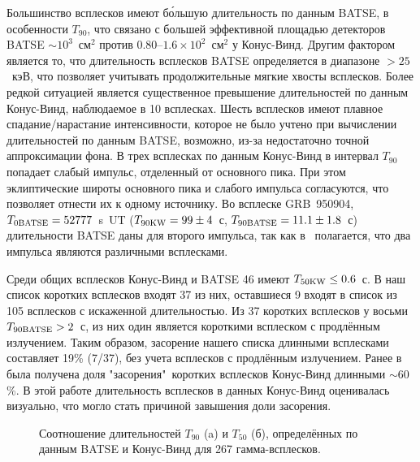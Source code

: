 Большинство всплесков имеют б\'{о}льшую длительность по данным BATSE, в особенности $T_{90}$, что связано с большей  эффективной площадью детекторов BATSE $\sim 10^3$~см$^2$ против 0.80--$1.6\times 10^2$~см$^2$ у Конус-Винд. Другим фактором является то, что длительность всплесков BATSE определяется в диапазоне $>25$~кэВ, что позволяет учитывать продолжительные мягкие хвосты всплесков. Более редкой ситуацией является существенное превышение длительностей по данным Конус-Винд, наблюдаемое в 10 всплесках. Шесть всплесков имеют плавное спадание/нарастание интенсивности, которое не было учтено при вычислении  длительностей по данным BATSE, возможно, из-за недостаточно точной аппроксимации фона. В трех всплесках по данным Конус-Винд в интервал $T_{90}$ попадает слабый импульс, отделенный от основного пика. При этом эклиптические широты основного пика и слабого импульса согласуются, что позволяет отнести их к одному источнику. Во всплеске GRB~950904, $T_{0\mbox{\scriptsize BATSE}} = 52777$~s~UT ($T_{90\mbox{\scriptsize KW}} = 99 \pm 4$~с, $T_{90\mbox{\scriptsize BATSE}} = 11.1\pm 1.8$~с) длительности BATSE даны для второго импульса, так как в~\citep{Hurley_2005} полагается, что два импульса являются различными всплесками.

Среди общих всплесков Конус-Винд и BATSE 46 имеют $T_{50\mbox{\scriptsize KW}} \leq 0.6$~с. В наш список коротких всплесков входят 37 из них, оставшиеся 9 входят в список из 105 всплесков с искаженной длительностью. Из 37 коротких всплесков у восьми $T_{90\mbox{\scriptsize BATSE}} > 2$~с, из них один является короткими всплеском с продлённым излучением. Таким образом, засорение нашего списка длинными всплесками составляет 19\% (7/37), без учета всплесков с продлённым излучением. Ранее в~\citep{Ofek_2007} была получена доля "засорения"\ коротких всплесков Конус-Винд длинными $\sim 60$\%. В этой работе длительность всплесков в данных Конус-Винд оценивалась визуально, что могло стать причиной завышения доли засорения. 

\begin{figure}[h]
  \begin{minipage}[h]{0.5\textwidth}
  \end{minipage}
  \hfill
  \begin{minipage}[h]{0.5\textwidth}
  \end{minipage}
  \caption{Соотношение длительностей $T_{90}$ (a) и $T_{50}$ (б), определённых по данным BATSE и Конус-Винд для 267 гамма-всплесков.}
  \label{img:T90andT50_KWvsBATSE}  
\end{figure}

